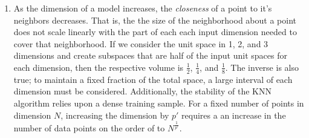 \documentclass{report}
\begin{document}
\begin{enumerate}
\begin{enumerate}
			\item As the dimension of a model increases, the \textit{closeness} of a point to it's neighbors decreases. That is, the the size of the neighborhood about a point does not scale linearly with the part of each each input dimension needed to cover that neighborhood. If we consider the unit space in 1, 2, and 3 dimensions and create subspaces that are half of the input unit spaces for each dimension, then the respective volume is $\frac{1}{2}$, $\frac{1}{4}$, and $\frac{1}{8}$. The inverse is also true; to maintain a fixed fraction of the total space, a large interval of each dimension must be considered. Additionally, the stability of the KNN algorithm relies upon a dense training sample. For a fixed number of points in dimension $N$, increasing the dimension by $p'$ requires a an increase in the number of data points on the order of to $N^\frac{1}{p'}$.
		\end{enumerate}
		
	
\end{enumerate}
\end{document}

